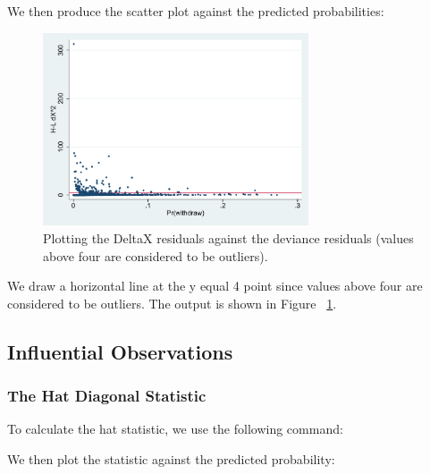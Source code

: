 \documentclass[a4paper,12pt,oneside]{book}
\begin{document}
We then produce the scatter plot against the predicted probabilities:

\begin{stlog}\end{stlog}
\begin{figure}[h]
    \centering
    \includegraphics[width=0.7\textwidth]{book_48.pdf}
    \caption{Plotting the DeltaX residuals against the deviance residuals (values above four are considered to be outliers).}
    \label{fig:res3}
\end{figure}

We draw a horizontal line at the y equal 4 point since values above four are considered to be outliers. The output is shown in Figure ~\ref{fig:res3}.
\subsection{Influential Observations}
\subsubsection{The Hat Diagonal Statistic}
To calculate the hat statistic, we use the following command:

\begin{stlog}\end{stlog}

We then plot the statistic against the predicted probability:
\end{document}
